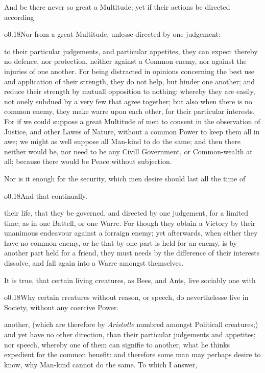 And be there never so great a Multitude; yet if their actions be
directed according \begin{wrapfigure}[5]{o}{0.18\textwidth}\wrapadj Nor
from a great Multitude, unlesse directed by one judgement:
\end{wrapfigure} to their particular judgements, and particular
appetites, they can expect thereby no defence, nor protection, neither
against a Common enemy, nor against the injuries of one another. For
being distracted in opinions concerning the best use and application
of their strength, they do not help, but hinder one another; and
reduce their strength by mutuall opposition to nothing: whereby they
are easily, not onely subdued by a very few that agree together; but
also when there is no common enemy, they make warre upon each other,
for their particular interests. For if we could suppose a great
Multitude of men to consent in the observation of Justice, and other
Lawes of Nature, without a common Power to keep them all in awe; we
might  as well suppose all Man-kind to do the same; and then
there neither would be, nor need to be any Civill Government, or
Common-wealth at all; because there would be Peace without subjection.

Nor is it enough for the security, which men desire should last all
the time of \begin{wrapfigure}[4]{o}{0.18\textwidth}\wrapadj And that
continually. \end{wrapfigure} their life, that they be governed, and
directed by one judgement, for a limited time; as in one Battell, or
one Warre. For though they obtain a Victory by their unanimous
endeavour against a forraign enemy; yet afterwards, when either they
have no common enemy, or he that by one part is held for an enemy, is
by another part held for a friend, they must needs by the difference
of their interests dissolve, and fall again into a Warre amongst
themselves.

It is true, that certain living creatures, as Bees, and Ants, live
sociably one with \begin{wrapfigure}[8]{o}{0.18\textwidth}\wrapadj Why
certain creatures without reason, or speech, do neverthelesse live in
Society, without any coercive Power. \end{wrapfigure} another, (which
are therefore by \textit{Aristotle} numbred amongst Politicall
creatures;) and yet have no other direction, than their particular
judgements and appetites; nor speech, whereby one of them can signifie
to another, what he thinks expedient for the common benefit: and
therefore some man may perhaps desire to know, why Man-kind cannot do
the same. To which I answer,

